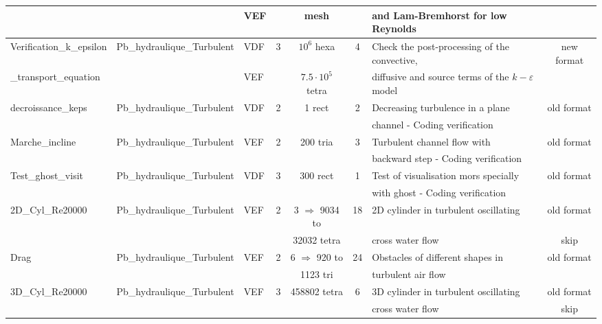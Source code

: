 \begin{table}[H]
\begin{centering}
\begin{tabular}{lclccclc}
\rowcolor{SkyBlue!10} & & VEF & & mesh & & and Lam-Bremhorst for low Reynolds & \\
\hline
\rowcolor{SkyBlue!10}Verification\_k\_epsilon & Pb\_hydraulique\_Turbulent & VDF & 3 & $10^6$ hexa & 4 & Check the post-processing of the convective, & new format \\ 
\rowcolor{SkyBlue!10}\_transport\_equation & & VEF & & $7.5 \cdot 10^5$ tetra & & diffusive and source terms of the $k-\varepsilon$ model &  \\
\hline
\rowcolor{SkyBlue!10}decroissance\_keps & Pb\_hydraulique\_Turbulent & VDF & 2 & 1 rect & 2 & Decreasing turbulence in a plane  & old format \\ 
\rowcolor{SkyBlue!10} & & & & & & channel - Coding verification& \\
\hline
\rowcolor{SkyBlue!10}Marche\_incline & Pb\_hydraulique\_Turbulent & VEF & 2 & 200 tria & 3 & Turbulent channel flow with  & old format \\ 
\rowcolor{SkyBlue!10} & & & & & & backward step - Coding verification & \\
\hline
\rowcolor{SkyBlue!10}Test\_ghost\_visit & Pb\_hydraulique\_Turbulent & VDF & 3 & 300 rect & 1 & Test of visualisation mors specially   & old format \\ 
\rowcolor{SkyBlue!10} & & & & & & with ghost - Coding verification & \\
\hline
\rowcolor{SkyBlue!10}2D\_Cyl\_Re20000 & Pb\_hydraulique\_Turbulent & VEF & 2 & 3 $\Rightarrow$ 9034 to & 18 & 2D cylinder in turbulent oscillating  & old format \\ 
\rowcolor{SkyBlue!10} & & & & 32032 tetra & & cross water flow & skip \\
\hline
\rowcolor{SkyBlue!10}Drag & Pb\_hydraulique\_Turbulent & VEF & 2 & 6 $\Rightarrow$ 920 to & 24 & Obstacles of different shapes in & old format \\ 
\rowcolor{SkyBlue!10} & & & & 1123 tri & & turbulent air flow & \\
\hline
\rowcolor{SkyBlue!10}3D\_Cyl\_Re20000 & Pb\_hydraulique\_Turbulent & VEF & 3 & 458802 tetra & 6 & 3D cylinder in turbulent oscillating & old format \\ 
\rowcolor{SkyBlue!10} & & & & & & cross water flow & skip \\
\hline
\end{tabular}
\end{centering}
\end{table}

\newpage


